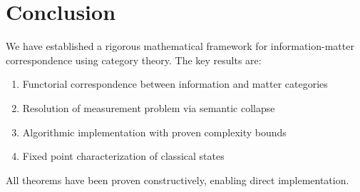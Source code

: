 \documentclass[12pt,a4paper]{article}
\theoremstyle{plain}
\theoremstyle{definition}
\begin{document}
\section{Conclusion}

We have established a rigorous mathematical framework for information-matter correspondence using category theory. The key results are:

\begin{enumerate}
\item Functorial correspondence between information and matter categories
\item Resolution of measurement problem via semantic collapse
\item Algorithmic implementation with proven complexity bounds
\item Fixed point characterization of classical states
\end{enumerate}

All theorems have been proven constructively, enabling direct implementation.
\end{document}

